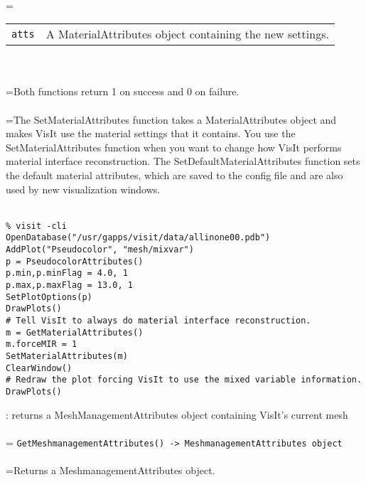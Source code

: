 \documentclass[10pt,a4paper]{report}
\begin{document}
 \\ 
\hangindent=\parindent 
\begin{tabular}{lp{9cm}}
\verb!atts! & A MaterialAttributes object containing the new settings. \\
\end{tabular} \\[-2mm]


 \\ 
\hangindent=\parindent Both functions return 1 on success and 0 on failure. \\[-3mm] 

 \\ 
\hangindent=\parindent The SetMaterialAttributes function takes a MaterialAttributes object and makes VisIt use the material settings that it contains. You use the SetMaterialAttributes function when you want to change how VisIt performs material interface reconstruction. The SetDefaultMaterialAttributes function sets the default material attributes, which are saved to the config file and are also used by new visualization windows. \\[-3mm] 

\\[-6mm]
\begin{verbatim}% visit -cli
OpenDatabase("/usr/gapps/visit/data/allinone00.pdb")
AddPlot("Pseudocolor", "mesh/mixvar")
p = PseudocolorAttributes()
p.min,p.minFlag = 4.0, 1
p.max,p.maxFlag = 13.0, 1
SetPlotOptions(p)
DrawPlots()
# Tell VisIt to always do material interface reconstruction.
m = GetMaterialAttributes()
m.forceMIR = 1
SetMaterialAttributes(m)
ClearWindow()
# Redraw the plot forcing VisIt to use the mixed variable information.
DrawPlots()
\end{verbatim}
\newpage


{}
: returns a MeshManagementAttributes object containing VisIt's current mesh\\[-3mm]

 \\ 
\hangindent=\parindent 
\verb!GetMeshmanagementAttributes() -> MeshmanagementAttributes object!\\ [-3mm]

 \\ 
\hangindent=\parindent Returns a MeshmanagementAttributes object. \\[-3mm] 
\end{document}
